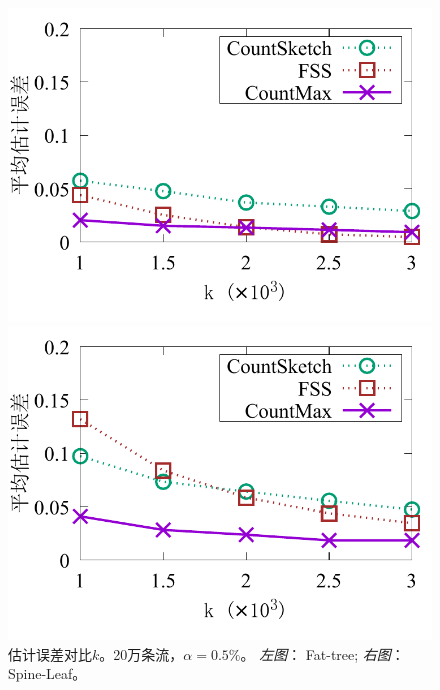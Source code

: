 \begin{figure}[ht]
	\centering
	\begin{minipage}[t]{0.49\linewidth}
		\centering
		\includegraphics[width=\linewidth]{fig/ft_k_appr_200000_095.pdf}
	\end{minipage}\vspace{-0.6em}%
	\begin{minipage}[t]{0.49\linewidth}
		\centering
		\includegraphics[width=\linewidth]{fig/hy_k_appr_200000_095.pdf}
	\end{minipage} \vspace{-0.6em}%
	\caption{\textnormal{估计误差对比$k$。20万条流，$\alpha = 0.5\%$。 \textit{左图}： Fat-tree; \textit{右图}： Spine-Leaf。}}
	\label{fig:acc,k,20,5}
\end{figure}


